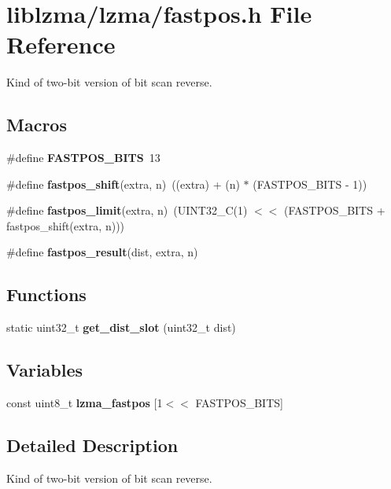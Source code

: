 \section{liblzma/lzma/fastpos.h File Reference}
\label{fastpos_8h}


Kind of two-\/bit version of bit scan reverse.  


\subsection*{Macros}
\begin{DoxyCompactItemize}
\item 
\mbox{\label{fastpos_8h_a665cd9527e83a1e2e33ace2ea28dd155}} 
\#define {\bfseries F\+A\+S\+T\+P\+O\+S\+\_\+\+B\+I\+TS}~13
\item 
\mbox{\label{fastpos_8h_a89c400de0bc8ad6c6ebc82a1d90a92aa}} 
\#define {\bfseries fastpos\+\_\+shift}(extra,  n)~((extra) + (n) $\ast$ (F\+A\+S\+T\+P\+O\+S\+\_\+\+B\+I\+TS -\/ 1))
\item 
\mbox{\label{fastpos_8h_a59bad784e2d2ed950f5b5d0aab440d4a}} 
\#define {\bfseries fastpos\+\_\+limit}(extra,  n)~(U\+I\+N\+T32\+\_\+C(1) $<$$<$ (F\+A\+S\+T\+P\+O\+S\+\_\+\+B\+I\+TS + fastpos\+\_\+shift(extra, n)))
\item 
\#define {\bfseries fastpos\+\_\+result}(dist,  extra,  n)
\end{DoxyCompactItemize}
\subsection*{Functions}
\begin{DoxyCompactItemize}
\item 
\mbox{\label{fastpos_8h_a8ab46c41c29a18f79e38c0f5f3a2e025}} 
static uint32\+\_\+t {\bfseries get\+\_\+dist\+\_\+slot} (uint32\+\_\+t dist)
\end{DoxyCompactItemize}
\subsection*{Variables}
\begin{DoxyCompactItemize}
\item 
\mbox{\label{fastpos_8h_a4c268bf2a70a18b8a3569cf2a9c7b50f}} 
const uint8\+\_\+t {\bfseries lzma\+\_\+fastpos} [1$<$$<$ F\+A\+S\+T\+P\+O\+S\+\_\+\+B\+I\+TS]
\end{DoxyCompactItemize}


\subsection{Detailed Description}
Kind of two-\/bit version of bit scan reverse. 



